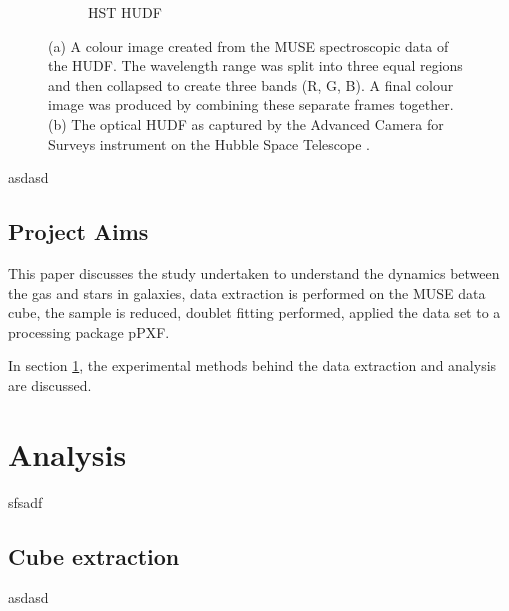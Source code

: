 \documentclass[12pt, onecolumn]{revtex4}    %
\begin{document}
\begin{figure}
\begin{subfigure}[b]{0.4\textwidth}
    \captionsetup{justification=justified}    
    \caption{HST HUDF}
    \label{fig:hubble_ultra_deep_field}
  \end{subfigure}
  \captionsetup{justification=justified}
  \caption[Hubble Ultra Deep Field]{(a) A colour image created from the MUSE spectroscopic data of the HUDF. The wavelength range was split into three equal regions and then collapsed to create three bands (R, G, B). A final colour image was produced by combining these separate frames together. (b) The optical HUDF as captured by the Advanced Camera for Surveys instrument on the Hubble Space Telescope \cite{hudf_image}. }
\end{figure}


asdasd

\subsection{Project Aims}
This paper discusses the study undertaken to understand the dynamics between the gas and stars in galaxies, data extraction is performed on the MUSE data cube, the sample is reduced, doublet fitting performed, applied the data set to a processing package pPXF. 

In section \ref{analysis}, the experimental methods behind the data extraction and analysis are discussed. 

\section{Analysis} 
\label{analysis}

sfsadf

\subsection{Cube extraction}

asdasd

\end{document}
